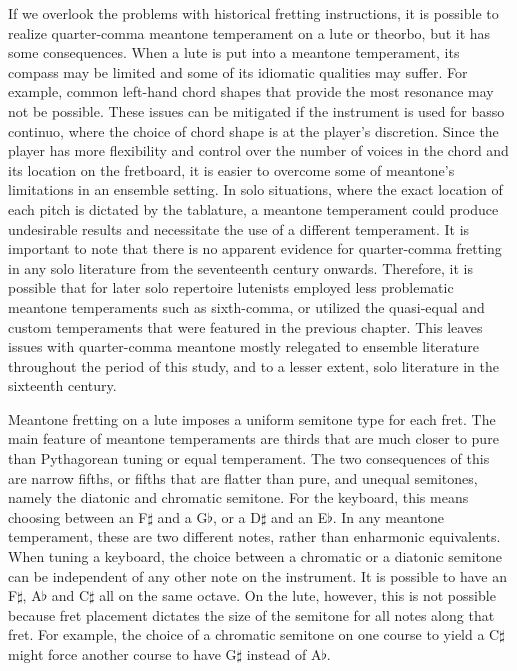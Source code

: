 If we overlook the problems with historical fretting instructions, it is possible to realize quarter-comma meantone
temperament on a lute or theorbo, but it has some consequences. When a lute is put into a meantone temperament, its
compass may be limited and some of its idiomatic qualities may suffer. For example, common left-hand chord shapes that
provide the most resonance may not be possible. These issues can be mitigated if the instrument is used for basso
continuo, where the choice of chord shape is at the player's discretion. Since the player has more flexibility and
control over the number of voices in the chord and its location on the fretboard, it is easier to overcome some of
meantone's limitations in an ensemble setting. In solo situations, where the exact location of each pitch is dictated
by the tablature, a meantone temperament could produce undesirable results and necessitate the use of a different
temperament. It is important to note that there is no apparent evidence for quarter-comma fretting in any solo
literature from the seventeenth century onwards. Therefore, it is possible that for later solo repertoire lutenists
employed less problematic meantone temperaments such as sixth-comma, or utilized the quasi-equal and custom temperaments
that were featured in the previous chapter. This leaves issues with quarter-comma meantone mostly relegated to ensemble
literature throughout the period of this study, and to a lesser extent, solo literature in the sixteenth century.

Meantone fretting on a lute imposes a uniform semitone type for each fret. The main feature of meantone temperaments are
thirds that are much closer to pure than Pythagorean tuning or equal temperament. The two consequences of this are
narrow fifths, or fifths that are flatter than pure, and unequal semitones, namely the diatonic and chromatic semitone.
For the keyboard, this means choosing between an F$\sharp$ and a G$\flat$, or a D$\sharp$ and an E$\flat$. In any
meantone temperament, these are two different notes, rather than enharmonic equivalents. When tuning a keyboard, the
choice between a chromatic or a diatonic semitone can be independent of any other note on the instrument. It is possible
to have an F$\sharp$, A$\flat$ and C$\sharp$ all on the same octave. On the lute, however, this is not possible because
fret placement dictates the size of the semitone for all notes along that fret. For example, the choice of a chromatic
semitone on one course to yield a C$\sharp$ might force another course to have G$\sharp$ instead of A$\flat$.


